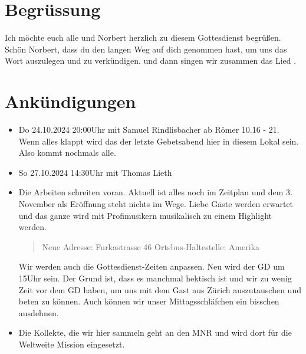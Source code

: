 
\section{Begrüssung}

Ich möchte euch alle und Norbert herzlich zu diesem Gottesdienst begrüßen.
Schön Norbert, dass du den langen Weg auf dich genommen hast, um uns das Wort auszulegen und zu verkündigen. 
\beten{} und dann singen wir zusammen das Lied .

\section{Ankündigungen}
\begin{itemize}
    \item {} Do 24.10.2024 20:00Uhr mit Samuel Rindlisbacher ab Römer 10.16 - 21. Wenn alles klappt wird das der letzte Gebetsabend hier in diesem Lokal sein. Also kommt nochmals alle.
    \item {} So 27.10.2024 14:30Uhr mit Thomas Lieth
    \item {} Die Arbeiten schreiten voran. Aktuell ist alles noch im Zeitplan und dem 3. November als Eröffnung steht nichts im Wege. Liebe Gäste werden erwartet und das ganze wird mit Profimusikern musikalisch zu einem Highlight werden.
    \begin{quote}
        Neue Adresse:
        Furkastrasse 46
        Ortsbus-Haltestelle: Amerika
    \end{quote}
    Wir werden auch die Gottesdienst-Zeiten anpassen. Neu wird der GD um 15Uhr sein. Der Grund ist, dass es manchmal hektisch ist und wir zu wenig Zeit vor dem GD haben, um uns mit dem Gast aus Zürich auszutauschen und beten zu können. Auch können wir unser Mittagsschläfchen ein bisschen ausdehnen.
    \item Die Kollekte, die wir hier sammeln geht an den MNR und wird dort für die Weltweite Mission eingesetzt.    
\end{itemize}

